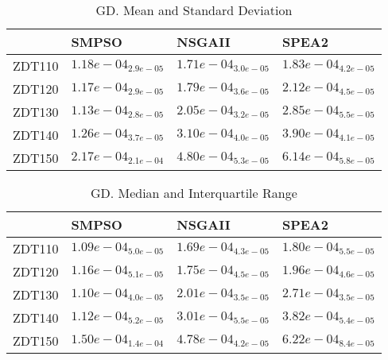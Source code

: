 \documentclass{article}
\begin{document}
\begin{table}
\caption{GD. Mean and Standard Deviation}
\label{table: GD}
\centering
\begin{scriptsize}
\begin{tabular}{llll}
\hline & SMPSO & NSGAII &  SPEA2\\
\hline 
ZDT110 & \cellcolor{gray95}$  1.18e-04_{ 2.9e-05}$ & \cellcolor{gray25}$  1.71e-04_{ 3.0e-05}$ & $  1.83e-04_{ 4.2e-05}$ \\
ZDT120 & \cellcolor{gray95}$  1.17e-04_{ 2.9e-05}$ & \cellcolor{gray25}$  1.79e-04_{ 3.6e-05}$ & $  2.12e-04_{ 4.5e-05}$ \\
ZDT130 & \cellcolor{gray95}$  1.13e-04_{ 2.8e-05}$ & \cellcolor{gray25}$  2.05e-04_{ 3.2e-05}$ & $  2.85e-04_{ 5.5e-05}$ \\
ZDT140 & \cellcolor{gray95}$  1.26e-04_{ 3.7e-05}$ & \cellcolor{gray25}$  3.10e-04_{ 4.0e-05}$ & $  3.90e-04_{ 4.1e-05}$ \\
ZDT150 & \cellcolor{gray95}$  2.17e-04_{ 2.1e-04}$ & \cellcolor{gray25}$  4.80e-04_{ 5.3e-05}$ & $  6.14e-04_{ 5.8e-05}$ \\
\hline
\end{tabular}
\end{scriptsize}
\end{table}

\begin{table}
\caption{GD. Median and Interquartile Range}
\label{table: GD}
\centering
\begin{scriptsize}
\begin{tabular}{llll}
\hline & SMPSO & NSGAII &  SPEA2\\
\hline 
ZDT110 & \cellcolor{gray95}$  1.09e-04_{ 5.0e-05}$ & \cellcolor{gray25}$  1.69e-04_{ 4.3e-05}$ & $  1.80e-04_{ 5.5e-05}$ \\
ZDT120 & \cellcolor{gray95}$  1.16e-04_{ 5.1e-05}$ & \cellcolor{gray25}$  1.75e-04_{ 4.5e-05}$ & $  1.96e-04_{ 4.6e-05}$ \\
ZDT130 & \cellcolor{gray95}$  1.10e-04_{ 4.0e-05}$ & \cellcolor{gray25}$  2.01e-04_{ 3.5e-05}$ & $  2.71e-04_{ 3.5e-05}$ \\
ZDT140 & \cellcolor{gray95}$  1.12e-04_{ 5.2e-05}$ & \cellcolor{gray25}$  3.01e-04_{ 5.5e-05}$ & $  3.82e-04_{ 5.4e-05}$ \\
ZDT150 & \cellcolor{gray95}$  1.50e-04_{ 1.4e-04}$ & \cellcolor{gray25}$  4.78e-04_{ 4.2e-05}$ & $  6.22e-04_{ 8.4e-05}$ \\
\hline
\end{tabular}
\end{scriptsize}
\end{table}
\end{document}
